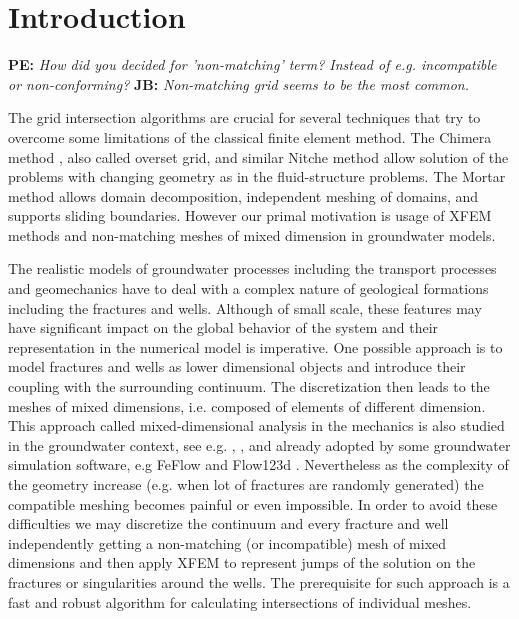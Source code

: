 \documentclass{elsarticle}
\newcommand{\noteJB}[1]{{\color{Blue} \textbf{JB: } \textit{#1}}}
\newcommand{\notePE}[1]{{\color{Orange} \textbf{PE: } \textit{#1}}}
\begin{document}

\section{Introduction}
\notePE{How did you decided for 'non-matching' term? Instead of e.g. incompatible or non-conforming?}
\noteJB{Non-matching grid seems to be the most common.}

The grid intersection algorithms are crucial for several techniques that try to overcome some limitations of the classical finite element method.
The Chimera method \cite{brezzi_analysis_2001}, also called overset grid, and similar Nitche method \cite{massing_efficient_2013}
allow solution of the problems with changing geometry as in the fluid-structure problems. 
The Mortar method \cite{belgacem_mortar_1999} allows domain decomposition, independent meshing of domains, and supports sliding boundaries.
However our primal motivation is usage of XFEM methods \cite{fries_extended/generalized_2010} and non-matching meshes of mixed dimension in groundwater models.

The realistic models of groundwater processes including the transport processes and geomechanics have to deal with 
a complex nature of geological formations including the fractures and wells. Although of small scale, these features may have significant impact 
on the global behavior of the system and their representation in the numerical model is imperative.
One possible approach is to model fractures and wells as lower dimensional objects and introduce their coupling with the surrounding continuum. 
The discretization then leads to the meshes of mixed dimensions, i.e. composed of elements of different dimension. This approach 
called mixed-dimensional analysis in the mechanics \cite{bournival_mesh-geometry_2008} is also studied in the groundwater context, see e.g. 
\cite{martin_modeling_2005}, \cite{fumagalli_numerical_2011}, \cite{brezina_analysis_2015} and 
already adopted by some groundwater simulation software, e.g FeFlow \cite{trefry_feflow:_2007} and Flow123d \cite{flow123d}.
Nevertheless as the complexity of the geometry increase (e.g. when lot of fractures are randomly generated) the compatible meshing becomes painful or even 
impossible. In order to avoid these difficulties we may discretize the continuum and every fracture and well independently getting a non-matching 
(or incompatible) mesh of mixed dimensions and then apply XFEM to represent jumps of the solution on the fractures or singularities 
around the wells. The prerequisite for such approach is a fast and robust algorithm for calculating intersections of individual meshes.
\end{document}
